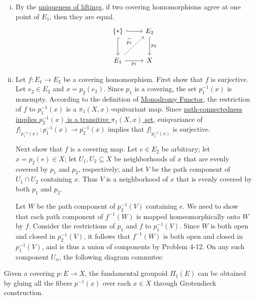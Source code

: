 \documentclass{report}
\begin{document}
\begin{prf}
	\begin{enumerate}[(i)]
		\item 
By the \hyperref[th:uniqueness_of_liftings]{uniqueness of liftings}, if two covering homomorphisms agree at one point of $E_1$, then they are equal.
\[
	\begin{tikzcd}[ampersand replacement=\&]
		\{*\} \arrow[r, "", hook] \arrow[d, ""', hook]                      \& E_2 \arrow[d, "p_2"] \\ [+8pt]
		E_1\arrow[r, "p_1"'] \arrow[ru, "\widetilde{p_1}", dashed] \& X
	\end{tikzcd}
\]
		\item  Let $f: E_1 \to E_2$ be a covering homomorphism. First show that $f$ is surjective. Let $e_2 \in E_2$ and $x = p_2(e_2)$. Since $p_1$ is a covering, the set $p_1^{-1}\left(x\right)$ is nonempty. According to the definition of \hyperref[th:monodromy_functor]{Monodromy Functor}, the restriction of $f$ to $p_1^{-1}\left(x\right)$ is a $\pi_1(X, x)$-equivariant map. Since \hyperref[th:connectedness_and_monodromy]{path-connectedness implies $p_2^{-1}(x)$ is a transitive $\pi_1(X,x)$ set}, euiqvariance of $f|_{p_1^{-1}\left(x\right)}:p^{-1}_1(x)\to p_2^{-1}(x)$ implies that $f|_{p_1^{-1}\left(x\right)}$ is surjective. 
		
		Next show that $f$ is a covering map. Let $e \in E_2$ be arbitrary; let $x=p_2(e) \in X$; let $U_1, U_2 \subseteq X$ be neighborhoods of $x$ that are evenly covered by $p_1$ and $p_2$, respectively; and let $V$ be the path component of $U_1 \cap U_2$ containing $x$. Thus $V$ is a neighborhood of $x$ that is evenly covered by both $p_1$ and $p_2$.

		Let $W$ be the path component of $p_2^{-1}(V)$ containing $e$. We need to show that each path component of $f^{-1}(W)$ is mapped homeomorphically onto $W$ by $f$. Consider the restrictions of $p_1$ and $f$ to $p_1^{-1}(V)$. Since $W$ is both open and closed in $p_2^{-1}(V)$, it follows that $f^{-1}(W)$ is both open and closed in $p_1^{-1}(V)$, and is thus a union of components by Problem 4-12. On any such component $U_\alpha$, the following diagram commutes:
	\end{enumerate}
\end{prf}

Given a covering $p:E\to X$, the fundamental groupoid $\Pi_1(E)$ can be obtained by gluing all the fibers $p^{-1}(x)$ over each $x\in X$ through Grotendieck construction.
\end{document}
